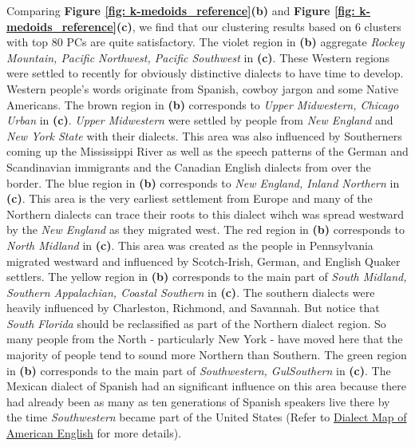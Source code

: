 \qquad  Comparing \textbf{Figure \ref{fig: k-medoids_reference}(b)} and \textbf{Figure \ref{fig: k-medoids_reference}(c)}, we find that our clustering results based on 6 clusters with top 80 PCs are quite satisfactory. The violet region in \textbf{(b)} aggregate \textit{Rockey Mountain, Pacific Northwest, Pacific Southwest} in \textbf{(c)}. These Western regions were settled to recently for obviously distinctive dialects to have time to develop. Western people's words originate from Spanish, cowboy jargon and some Native Americans. The brown region in \textbf{(b)} corresponds to \textit{Upper Midwestern, Chicago Urban} in \textbf{(c)}. \textit{Upper Midwestern} were settled by people from \textit{New England} and \textit{New York State} with their dialects. This area was also influenced by Southerners coming up the Mississippi River as well as the speech patterns of the German and Scandinavian immigrants and the Canadian English dialects from over the border. The blue region in \textbf{(b)} corresponds to \textit{New England, Inland Northern} in \textbf{(c)}. This area is the very earliest settlement from Europe and many of the Northern dialects can trace their roots to this dialect wihch was spread westward by the \textit{New England} as they migrated west. The red region in \textbf{(b)} corresponds to \textit{North Midland} in \textbf{(c)}. This area was created as the people in Pennsylvania migrated westward and influenced by Scotch-Irish, German, and English Quaker settlers. The yellow region in \textbf{(b)} corresponds to the main part of\textit{ South Midland, Southern Appalachian, Coastal Southern} in \textbf{(c)}. The southern dialects were heavily influenced by Charleston, Richmond, and Savannah. But notice that \textit{South Florida} should be reclassified as part of the Northern dialect region. So many people from the North - particularly New York - have moved here that the majority of people tend to sound more Northern than Southern. The green region in \textbf{(b)} corresponds to the main part of \textit{Southwestern, GulSouthern} in \textbf{(c)}. The Mexican dialect of Spanish had an significant influence on this area because there had already been as many as ten generations of Spanish speakers live there by the time \textit{Southwestern} became part of the United States (Refer to \href{http://robertspage.com/dialects.html}{Dialect Map of American English} for more details).

